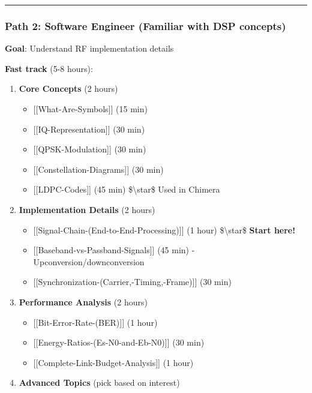 \begin{center}\rule{0.5\linewidth}{0.5pt}\end{center}

\subsubsection{\texorpdfstring{Path 2: \textbf{Software Engineer}
(Familiar with DSP
concepts)}{Path 2: Software Engineer (Familiar with DSP concepts)}}\label{path-2-software-engineer-familiar-with-dsp-concepts}

\textbf{Goal}: Understand RF implementation details

\textbf{Fast track} (5-8 hours):

\begin{enumerate}
\def\labelenumi{\arabic{enumi}.}
\tightlist
\item
  \textbf{Core Concepts} (2 hours)

  \begin{itemize}
  \tightlist
  \item
    {[}{[}What-Are-Symbols{]}{]} (15 min)
  \item
    {[}{[}IQ-Representation{]}{]} (30 min)
  \item
    {[}{[}QPSK-Modulation{]}{]} (30 min)
  \item
    {[}{[}Constellation-Diagrams{]}{]} (30 min)
  \item
    {[}{[}LDPC-Codes{]}{]} (45 min) \$\textbackslash star\$ Used in
    Chimera
  \end{itemize}
\item
  \textbf{Implementation Details} (2 hours)

  \begin{itemize}
  \tightlist
  \item
    {[}{[}Signal-Chain-(End-to-End-Processing){]}{]} (1 hour)
    \$\textbackslash star\$ \textbf{Start here!}
  \item
    {[}{[}Baseband-vs-Passband-Signals{]}{]} (45 min) -
    Upconversion/downconversion
  \item
    {[}{[}Synchronization-(Carrier,-Timing,-Frame){]}{]} (30 min)
  \end{itemize}
\item
  \textbf{Performance Analysis} (2 hours)

  \begin{itemize}
  \tightlist
  \item
    {[}{[}Bit-Error-Rate-(BER){]}{]} (1 hour)
  \item
    {[}{[}Energy-Ratios-(Es-N0-and-Eb-N0){]}{]} (30 min)
  \item
    {[}{[}Complete-Link-Budget-Analysis{]}{]} (1 hour)
  \end{itemize}
\item
  \textbf{Advanced Topics} (pick based on interest)


\end{enumerate}
